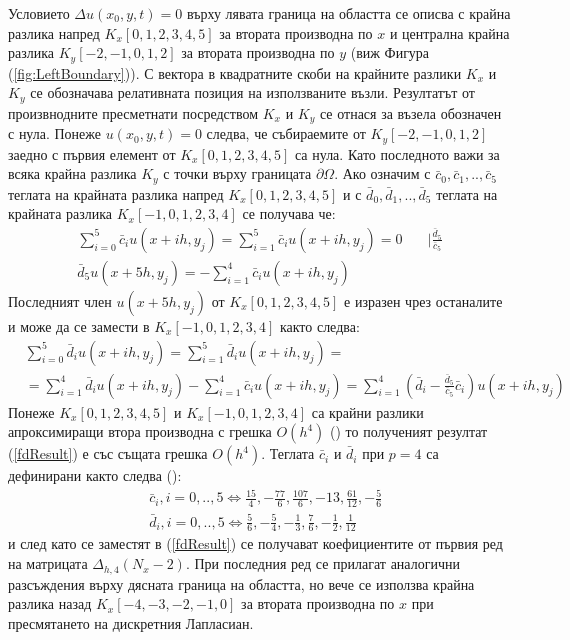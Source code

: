 \documentclass{article}
\newcommand{\rf}[1]{(\ref{#1})}
\begin{document}
Условието $\Delta u(x_0, y, t) = 0$ върху лявата граница на областта се описва с крайна разлика напред $K_x[0,1,2,3,4,5]$ за втората производна по $x$ и централна крайна разлика $K_y[-2,-1,0,1,2]$ за втората производна по $y$ (виж Фигура \rf{fig:LeftBoundary}). С вектора в квадратните скоби на крайните разлики $K_x$ и $K_y$ се обозначава релативната позиция на използваните възли. Резултатът от произвнодните пресметнати посредством $K_x$ и $K_y$ се отнася за възела обозначен с нула. Понеже $u(x_0, y, t) = 0$ следва, че събираемите от $K_y[-2,-1,0,1,2]$ заедно с първия елемент от $K_x[0,1,2,3,4,5]$ са нула. Като последното важи за всяка крайна разлика $K_y$ с точки върху границата $\partial \Omega$. Ако означим с $\bar c_0, \bar c_1, .., \bar c_5$ теглата на крайната разлика напред $K_x[0,1,2,3,4,5]$ и с $\bar d_0, \bar d_1,.., \bar d_5$ теглата на крайната разлика $K_x[-1,0,1,2,3,4]$ се получава че:
\begin{align}
\sum\limits_{i=0}^{5} \bar c_i u(x+ih, y_j) = \sum\limits_{i=1}^{5} \bar c_i u(x+ih, y_j) = 0 &  \quad | \frac{\bar d_5}{\bar c_5} \nonumber\\
\bar d_5 u(x+5h, y_j) = -\sum\limits_{i=1}^{4} \bar c_i u(x+ih, y_j) & \nonumber
\end{align}
Последният член $u(x+5h, y_j)$ от $K_x[0,1,2,3,4,5]$ е изразен чрез останалите и може да се замести в $K_x[-1,0,1,2,3,4]$ както следва:
\begin{align}\label{fdResult}
&\sum\limits_{i=0}^{5} \bar d_i u(x+ih, y_j) = \sum\limits_{i=1}^{5} \bar d_i u(x+ih, y_j)  =  \\
&= \sum\limits_{i=1}^{4} \bar d_i u(x+ih, y_j) -\sum\limits_{i=1}^{4} \bar c_i u(x+ih, y_j) = \sum\limits_{i=1}^{4} \left( \bar d_i - \frac{\bar d_5}{\bar c_5} \bar c_i \right) u(x+ih, y_j) \nonumber
\end{align}
Понеже $K_x[0,1,2,3,4,5]$ и $K_x[-1,0,1,2,3,4]$ са крайни разлики апроксимиращи втора производна с грешка $O(h^4)$ (\cite{forn}) то полученият резултат \rf{fdResult} е със същата грешка $O(h^4)$. Теглата $\bar c_i$ и $\bar d_i$ при $p=4$ са дефинирани както следва (\cite{forn}):
\begin{align}
&\bar c_i, i = 0,..,5 \iff \frac{15}{4}, -\frac{77}{6}, \frac{107}{6}, -13, \frac{61}{12}, -\frac{5}{6} \\
&\bar d_i, i = 0,..,5 \iff \frac{5}{6}, -\frac{5}{4}, -\frac{1}{3}, \frac{7}{6}, -\frac{1}{2}, \frac{1}{12} 
\end{align}
и след като се заместят в \rf{fdResult} се получават коефициентите от първия ред на матрицата $\Delta_{h,4}(N_x-2)$. При последния ред се прилагат аналогични разсъждения върху дясната граница на областта, но вече се използва крайна разлика назад $K_x[-4,-3,-2,-1,0]$ за втората производна по $x$ при пресмятането на дискретния Лапласиан. 
\end{document}
